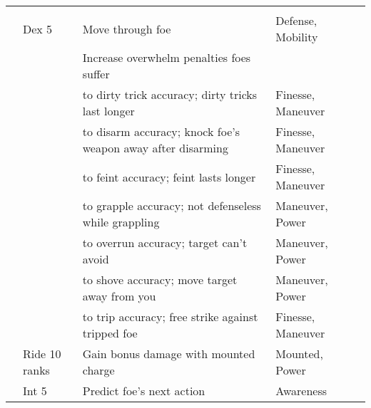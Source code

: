 \begin{longtabuwrapper}
\begin{longtabu}{>{\lcol}p{10em} >{\lcol}p{15em} >{\lcol}X >{\lcol}p{8em} >{\lcol}p{3em}}
        \midrule
         &  &  &  &  \\
         & Dex 5 & Move through foe & Defense, Mobility &  \\
         & \x & Increase overwhelm penalties foes suffer & \x &  \\
         & \x &  to dirty trick accuracy; dirty tricks last longer & Finesse, Maneuver &  \\
         & \x &  to disarm accuracy; knock foe's weapon away after disarming & Finesse, Maneuver &  \\
         & \x &  to feint accuracy; feint lasts longer & Finesse, Maneuver &  \\
         & \x &  to grapple accuracy; not defenseless while grappling & Maneuver, Power &  \\
         & \x &  to overrun accuracy; target can't avoid & Maneuver, Power &  \\
         & \x &  to shove accuracy; move target away from you & Maneuver, Power &  \\
         & \x &  to trip accuracy; free strike against tripped foe & Finesse, Maneuver &  \\
         & Ride 10 ranks & Gain bonus damage with mounted charge & Mounted, Power &  \\
         & Int 5 & Predict foe's next action & Awareness &  \\


\end{longtabu}
\end{longtabuwrapper}
